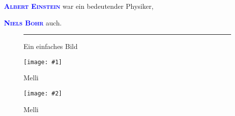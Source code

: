 \documentclass[12pt,ngerman]{scrartcl}
\newcommand{\person}[1]{\textcolor{red}{\textsc{\bfseries #1}}}
\renewcommand{\person}[1]{\textcolor{blue}{\textsc{\bfseries #1}}}
\newcommand{\bild}{\textcolor{lime}{\rule{8cm}{6cm}}}
\newcommand{\image}[2]{%
\begin{figure}
\centering
\texttt{[image: \#1]}
\caption{#2}\label{fig:#1}
\end{figure}
}
\newcommand{\imagew}[3][1.0]{%
\begin{figure}
\centering
\texttt{[image: \#2]}
\caption{#3}\label{fig:#2}
\end{figure}
}
\begin{document}
\person{Albert Einstein} war ein bedeutender Physiker,

\person{Niels Bohr} auch.

\begin{figure}
\centering
\bild
\caption{Ein einfaches Bild}
\end{figure}


\image{Katze}{Melli}

\pageref{fig:Katze}


\imagew[0.5]{Katze}{Melli}
\end{document}
